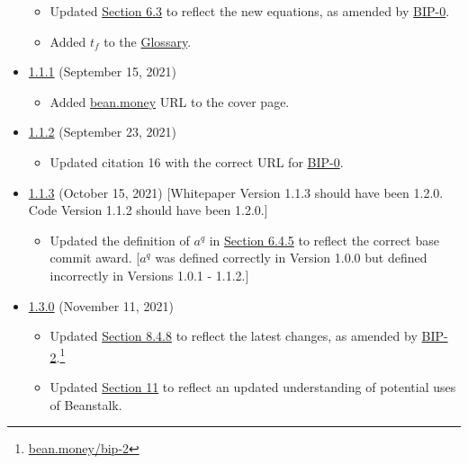\documentclass[class=article, crop=false]{standalone}
\begin{document}
\begin{itemize}[topsep=0pt, itemsep=3pt,leftmargin=16pt]
    \begin{itemize}
        \item Updated \hyperlink{subsection.6.3}{Section 6.3} to reflect the new  equations, as amended by \href{https://bean.money/bip-0}{BIP-0}.
        \item Added $t_f$ to the \hyperlink{subsection.14.11}{Glossary}.
    \end{itemize}
    \item \href{https://github.com/BeanstalkFarms/Beanstalk-Whitepaper/blob/master/version-history/beanstalk1_1_1.pdf}{1.1.1} (September 15, 2021)
    \begin{itemize}
        \item Added \href{https://bean.money/}{bean.money} URL to the cover page.
    \end{itemize}
    \item \href{https://github.com/BeanstalkFarms/Beanstalk-Whitepaper/blob/master/version-history/beanstalk1_1_2.pdf}{1.1.2} (September 23, 2021)
    \begin{itemize}
        \item Updated citation 16 with the correct URL for \href{https://bean.money/bip-0}{BIP-0}.
    \end{itemize}
    \item \href{https://github.com/BeanstalkFarms/Beanstalk-Whitepaper/blob/master/version-history/beanstalk1_1_3.pdf}{1.1.3} (October 15, 2021) [Whitepaper Version 1.1.3 should have been 1.2.0. Code Version 1.1.2 should have been 1.2.0.]
    \begin{itemize}
        \item Updated the definition of $a^q$ in \hyperlink{subsubsection.6.4.5}{Section 6.4.5} to reflect the correct base commit award. [$a^q$ was defined correctly in Version 1.0.0 but defined incorrectly in Versions 1.0.1 - 1.1.2.]
    \end{itemize}
    \item \href{https://github.com/BeanstalkFarms/Beanstalk-Whitepaper/blob/master/version-history/beanstalk1_3_0.pdf}{1.3.0} (November 11, 2021)
    \begin{itemize}
        \item Updated \hyperlink{subsubsection.8.4.8}{Section 8.4.8} to reflect the latest  changes, as amended by \href{https://bean.money/bip-2}{BIP-2}.\footnote{\href{https://bean.money/bip-2}{bean.money/bip-2}}
        \item Updated \hyperlink{section.11}{Section 11} to reflect an updated understanding of potential uses of Beanstalk. 

\end{itemize}
\end{itemize}
\end{document}
